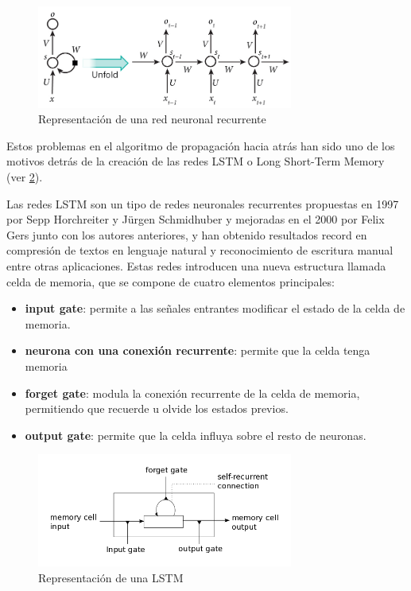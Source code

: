 \begin{figure}[!ht]
	\centering
	\includegraphics[width=0.75\textwidth]{imaxes/rnn.jpg}
	\caption{Representación de una red neuronal recurrente}
	\label{rnn}
\end{figure}

Estos problemas en el algoritmo de propagación hacia atrás han sido uno de los motivos detrás de la creación de las redes LSTM o Long Short-Term Memory (ver \ref{lstm}).

Las redes LSTM son un tipo de redes neuronales recurrentes propuestas en 1997 por Sepp Horchreiter y Jürgen Schmidhuber y mejoradas en el 2000 por Felix Gers junto con los autores anteriores, y han obtenido resultados record en compresión de textos en lenguaje natural y reconocimiento de escritura manual entre otras aplicaciones. Estas redes introducen una nueva estructura llamada celda de memoria, que se compone de cuatro elementos principales:
\begin{itemize}
	\item \textbf{input gate}: permite a las señales entrantes modificar el estado de la celda de memoria.
	\item \textbf{neurona con una conexión recurrente}: permite que la celda tenga memoria
	\item \textbf{forget gate}: modula la conexión recurrente de la celda de memoria, permitiendo que recuerde u olvide los estados previos.
	\item \textbf{output gate}: permite que la celda influya sobre el resto de neuronas.
\end{itemize}

\begin{figure}[!ht]
	\centering
	\includegraphics[width=0.75\textwidth]{imaxes/lstm.png}
	\caption{Representación de una LSTM}
	\label{lstm}
\end{figure}

